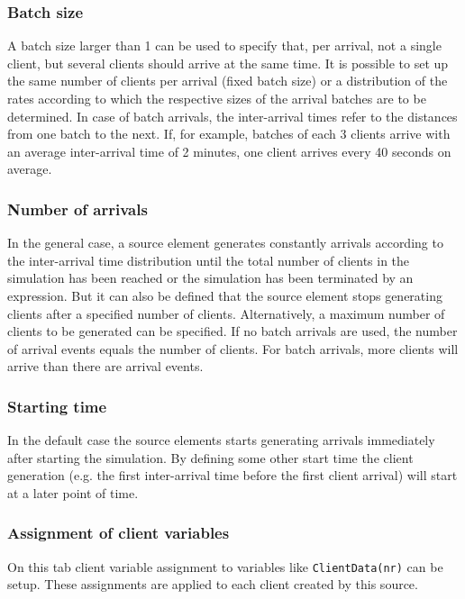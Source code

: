 \subsubsection*{Batch size}

A batch size larger than 1 can be used to specify that, per arrival, not a single client,
but several clients should arrive at the same time. It is possible to set up the same number
of clients per arrival (fixed batch size) or a distribution of the rates according to which
the respective sizes of the arrival batches are to be determined.
In case of batch arrivals, the inter-arrival times refer to the distances from one batch to the next.
If, for example, batches of each 3 clients arrive with an average inter-arrival time of 2 minutes,
one client arrives every 40 seconds on average.

\subsubsection*{Number of arrivals}

In the general case, a source element generates constantly arrivals according to the
inter-arrival time distribution until the total number of clients in the simulation has been reached
or the simulation has been terminated by an expression. But it can also be defined that the
source element stops generating clients after a specified number of clients.
Alternatively, a maximum number of clients to be generated can be specified.
If no batch arrivals are used, the number of arrival events equals the
number of clients. For batch arrivals, more clients will arrive than there are arrival events.

\subsubsection*{Starting time}

In the default case the source elements starts generating arrivals immediately after
starting the simulation. By defining some other start time the client generation
(e.g. the first inter-arrival time before the first client arrival) will start at a later
point of time.

\subsubsection*{Assignment of client variables}

On this tab client variable assignment to variables like \texttt{ClientData(nr)} can be setup.
These assignments are applied to each client created by this source.


